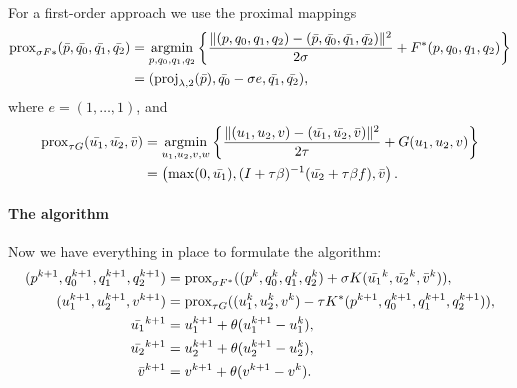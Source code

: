 For a first-order approach we use the proximal mappings
\begin{align*}
    \Prox_{\sigma F*}(\bar{p},\bar{q_0},\bar{q_1},\bar{q_2})
    &= \argmin_{p,q_0,q_1,q_2} \left\{
        \frac{\|
            (p,q_0,q_1,q_2)-(\bar{p},\bar{q_0},\bar{q_1},\bar{q_2})
        \|^2}{2\sigma} + F^*(p,q_0,q_1,q_2)
    \right\} \\
    &= (\proj_{\lambda,2}(\bar{p}),\bar{q_0}-\sigma e,\bar{q_1},\bar{q_2}),
\end{align*}
where $e = (1,\dots,1)$, and
\begin{align*}
    \Prox_{\tau G}(\bar{u_1},\bar{u_2},\bar{v})
    &= \argmin_{u_1,u_2,v,w} \left\{
        \frac{\|
            (u_1,u_2,v)-(\bar{u_1},\bar{u_2},\bar{v})
        \|^2}{2\tau} + G(u_1,u_2,v)
    \right\} \\
    &= \left(
        \max(0,\bar{u_1}),
        (I+\tau \beta)^{-1}(\bar{u_2} + \tau \beta f),
        \bar{v}
    \right).
\end{align*}

\paragraph{The algorithm}

Now we have everything in place to formulate the algorithm:
\begin{align*}
    (p^{k+1},q_0^{k+1},q_1^{k+1},q_2^{k+1}) &= \operatorname{prox}_{\sigma F^*}(
        (p^{k},q_0^{k},q_1^{k},q_2^{k})
        + \sigma K(\bar{u_1}^{k},\bar{u_2}^{k},\bar{v}^{k})
    ), \\
    (u_1^{k+1},u_2^{k+1},v^{k+1}) &= \operatorname{prox}_{\tau G}(
        (u_1^{k},u_2^{k},v^{k})
        - \tau K^*(p^{k+1},q_0^{k+1},q_1^{k+1},q_2^{k+1})
    ), \\
    \bar{u_1}^{k+1} &= u_1^{k+1} + \theta(u_1^{k+1}-u_1^{k}), \\
    \bar{u_2}^{k+1} &= u_2^{k+1} + \theta(u_2^{k+1}-u_2^{k}), \\
    \bar{v}^{k+1} &= v^{k+1} + \theta(v^{k+1}-v^{k}).
\end{align*}

